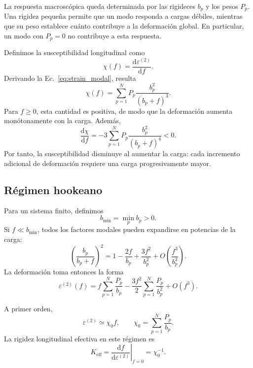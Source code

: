 \documentclass[11pt,a4paper]{article}
\begin{document}
La respuesta macroscópica queda determinada por las rigideces
$b_p$ y los pesos $P_p$. Una rigidez pequeña permite que un
modo responda a cargas débiles, mientras que su peso establece
cuánto contribuye a la deformación global. En particular,
un modo con $P_p=0$ no contribuye a esta respuesta.

Definimos la susceptibilidad longitudinal como
\begin{equation}
\chi(f)
=
\frac{\mathrm{d}\varepsilon^{(2)}}{\mathrm{d}f}.
\end{equation}
Derivando la Ec.~\eqref{eq:strain_modal}, resulta
\begin{equation}
\boxed{
\chi(f)
=
\sum_{p=1}^{N}
P_p\frac{b_p^2}{(b_p+f)^3}.
}
\label{eq:modal_compliance}
\end{equation}
Para $f\geq0$, esta cantidad es positiva, de modo que la
deformación aumenta monótonamente con la carga. Además,
\begin{equation}
\frac{\mathrm{d}\chi}{\mathrm{d}f}
=
-3\sum_{p=1}^{N}
P_p\frac{b_p^2}{(b_p+f)^4}
<0.
\label{eq:compliance_derivative}
\end{equation}
Por tanto, la susceptibilidad disminuye al aumentar la carga:
cada incremento adicional de deformación requiere una
carga progresivamente mayor.

\subsection{Régimen hookeano}

Para un sistema finito, definimos
\begin{equation}
b_{\min}=\min_p b_p>0.
\end{equation}
Si $f\ll b_{\min}$, todos los factores modales pueden
expandirse en potencias de la carga:
\begin{equation}
\left(\frac{b_p}{b_p+f}\right)^2
=
1-\frac{2f}{b_p}
+\frac{3f^2}{b_p^2}
+O\!\left(\frac{f^3}{b_p^3}\right).
\end{equation}
La deformación toma entonces la forma
\begin{equation}
\varepsilon^{(2)}(f)
=
f\sum_{p=1}^{N}\frac{P_p}{b_p}
-
\frac{3f^2}{2}\sum_{p=1}^{N}\frac{P_p}{b_p^2}
+O(f^3).
\label{eq:strain_low_force}
\end{equation}

A primer orden,
\begin{equation}
\boxed{
\varepsilon^{(2)}\simeq\chi_0 f,
\qquad
\chi_0=\sum_{p=1}^{N}\frac{P_p}{b_p}.
}
\label{eq:hookean_compliance}
\end{equation}
La rigidez longitudinal efectiva en este régimen es
\begin{equation}
K_{\mathrm{eff}}
=
\left.
\frac{\mathrm{d}f}{\mathrm{d}\varepsilon^{(2)}}
\right|_{f=0}
=
\chi_0^{-1}.
\label{eq:effective_stiffness}
\end{equation}
\end{document}
